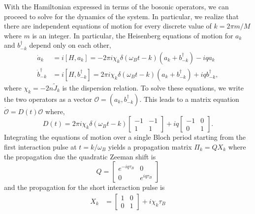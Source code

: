 \begin{bibunit}
With the Hamiltonian expressed in terms of the bosonic operators, we can proceed to solve for the dynamics of the system. In particular, we realize that there are independent equations of motion for every discrete value of $k = 2\pi m/M$ where $m$ is an integer. In particular, the Heisenberg equations of motion for $a_k$ and $b_{-k}^\dagger$ depend only on each other,
\begin{subequations}
\label{Seq:MomentumSpaceEOM_UnAveraged}
\begin{align}
    \dot{{a}}_k &= i[H,{a}_k] = -2\pi i \chi_k \delta(\omega_Bt - k) \left({a}_{k} + {b}_{-k}^\dagger\right) - i q  a_k
    \\
    \dot{{b}}_{-k}^\dagger &= i[H,{b}_{-k}^\dagger] = 2\pi i \chi_k \delta(\omega_Bt - k) \left({a}_{k} + {b}_{-k}^\dagger\right) + i q  b^\dagger_{-k},
\end{align} 
\end{subequations}
where $\chi_k = -2n\tilde{J}_k$ is the dispersion relation. To solve these equations, we write the two operators as a vector $\mathcal{O} = (a_{k}, b_{-k}^\dagger)$. This leads to a matrix equation $\dot{\mathcal{O}} = D(t) \mathcal{O}$ where,
\begin{equation}
D(t) = 2\pi i\chi_k \delta(\omega_Bt - k) 
 \begin{bmatrix}
    -1 & -1  \\
   1 & 1
\end{bmatrix}
+ iq 
 \begin{bmatrix}
    -1 & 0 \\
    0 & 1
\end{bmatrix}.
\end{equation}
Integrating the equations of motion over a single Bloch period starting from the first interaction pulse at $t = k/\omega_B$ yields a propagation matrix $\Pi_k = QX_k$ where the propagation due the quadratic Zeeman shift is 
\begin{equation}
    Q =
 \begin{bmatrix}
    e^{-iq\tau_B} & 0 \\
    0 & e^{iq\tau_B}
\end{bmatrix}
\end{equation}
and the propagation for the short interaction pulse is
\begin{equation}
\begin{aligned}
X_k &=  \begin{bmatrix}
    1 & 0  \\
   0 & 1
\end{bmatrix} + i\chi_k\tau_B

\end{aligned}
\end{equation}
\end{bibunit}
